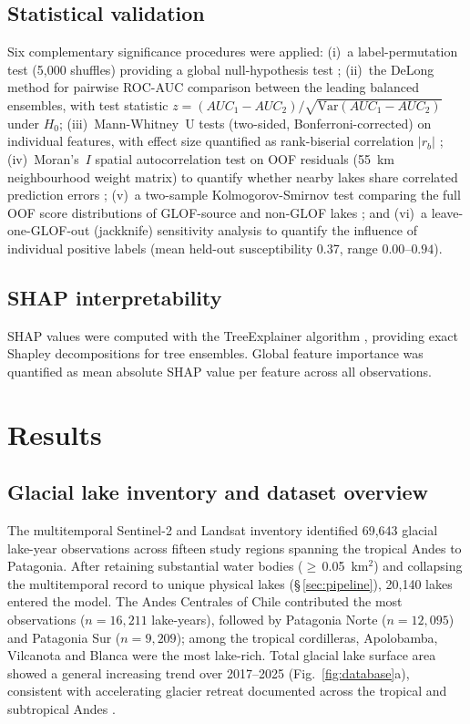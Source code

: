 \documentclass[pdflatex,sn-basic]{sn-jnl}%
\begin{document}
\subsection{Statistical validation}

Six complementary significance procedures were applied:
(i)~a label-permutation test (5{,}000 shuffles) providing a global
null-hypothesis test \citep{Lobo2008};
(ii)~the DeLong method \citep{DeLong1988} for pairwise ROC-AUC
comparison between the leading balanced ensembles, with test
statistic
$z\!=\!(AUC_1-AUC_2)/\sqrt{\mathrm{Var}(AUC_1-AUC_2)}$ under $H_0$;
(iii)~Mann-Whitney~U tests (two-sided, Bonferroni-corrected) on individual
features, with effect size quantified as rank-biserial correlation $|r_b|$
\citep{Cliff1993};
(iv)~Moran's~$I$ spatial autocorrelation test on OOF residuals
(55~km neighbourhood weight matrix) to quantify whether nearby lakes share
correlated prediction errors \citep{Cliff1981};
(v)~a two-sample Kolmogorov-Smirnov test comparing the full OOF score
distributions of GLOF-source and non-GLOF lakes \citep{Massey1951}; and
(vi)~a leave-one-GLOF-out (jackknife) sensitivity analysis to quantify
the influence of individual positive labels \citep{Efron1982} (mean
held-out susceptibility 0.37, range $0.00$--$0.94$).

\subsection{SHAP interpretability}

SHAP values were computed with the TreeExplainer algorithm
\citep{LundbergLee2017,Lundberg2020}, providing exact Shapley
decompositions for tree ensembles. Global feature importance was
quantified as mean absolute SHAP value per feature across all
observations.

\section{Results}\label{sec:results}

\subsection{Glacial lake inventory and dataset overview}

The multitemporal Sentinel-2 and Landsat inventory identified 69{,}643
glacial lake-year observations across fifteen study regions spanning the
tropical Andes to Patagonia. After retaining substantial water bodies
($\geq$\,0.05~km$^2$) and collapsing the multitemporal record to unique
physical lakes (\S\,\ref{sec:pipeline}), 20{,}140 lakes entered the model.
The Andes Centrales of Chile contributed the most observations
($n\!=\!16{,}211$ lake-years), followed by Patagonia Norte
($n\!=\!12{,}095$) and Patagonia Sur ($n\!=\!9{,}209$); among the tropical
cordilleras, Apolobamba, Vilcanota and Blanca were the most lake-rich.
Total glacial lake surface area showed a general increasing trend over
2017--2025 (Fig.~\ref{fig:database}a), consistent with accelerating glacier
retreat documented across the tropical and subtropical Andes
\citep{Dussaillant2019,GlaMBIE2025,Veettil2019}.
\end{document}
